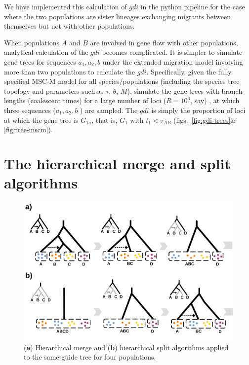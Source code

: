 \documentclass{article1}
\begin{document}
We have implemented this calculation of $gdi$ in the python pipeline for the case
where the two populations are sister lineages exchanging migrants between themselves but
not with other populations.

When populations $A$ and $B$ are involved in gene flow with other populations,
analytical calculation of the $gdi$ becomes complicated.  It is simpler to simulate gene
trees for sequences $a_1, a_2, b$ under the extended migration model involving more than
two populations to calculate the $gdi$.  Specifically, given the fully specified MSC-M
model for all species/populations (including the species tree topology and parameters
such as $\tau$, $\theta$, $M$), simulate the gene trees with branch lengths (coalescent
times) for a large number of loci ($R = 10^6$, say) , at which three sequences ($a_1,
a_2, b$ ) are sampled.  The $gdi$ is simply the proportion of loci at which the gene
tree is $G_{1a}$, that is, $G_1$ with $t_1 < \tau_{AB}$
(figs.~\ref{fig:gdi-trees}\&\ref{fig:tree-mscm}).


\section{The hierarchical merge and split algorithms}

\begin{figure}[t]
   \centering %
   \includegraphics[scale=0.25]{figs/Methods/HM_algo} %
   
   \caption{(\textbf{a}) Hierarchical merge and (\textbf{b}) hierarchical split
   algorithms applied to the same guide tree for four populations. \\%
	} 
	\label{fig:gdi-algorithms}
\vspace{-0.5cm}
\end{figure}
\end{document}
